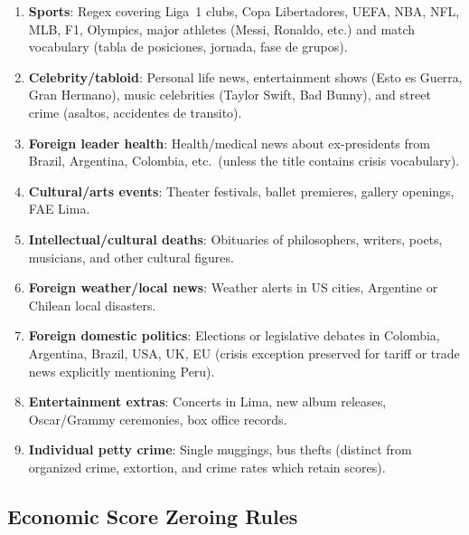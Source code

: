 \documentclass[12pt,a4paper]{article}
\begin{document}
\begin{enumerate}
  \item \textbf{Sports}: Regex covering Liga~1 clubs,
    Copa Libertadores, UEFA, NBA, NFL, MLB, F1, Olympics, major athletes
    (Messi, Ronaldo, etc.) and match vocabulary (tabla de posiciones,
    jornada, fase de grupos).

  \item \textbf{Celebrity/tabloid}: Personal life news, entertainment
    shows (Esto es Guerra, Gran Hermano), music celebrities (Taylor Swift,
    Bad Bunny), and street crime (asaltos, accidentes de transito).

  \item \textbf{Foreign leader health}: Health/medical news about
    ex-presidents from Brazil, Argentina, Colombia, etc.\ (unless the
    title contains crisis vocabulary).

  \item \textbf{Cultural/arts events}: Theater festivals, ballet
    premieres, gallery openings, FAE Lima.

  \item \textbf{Intellectual/cultural deaths}: Obituaries of
    philosophers, writers, poets, musicians, and other cultural figures.

  \item \textbf{Foreign weather/local news}: Weather alerts in US
    cities, Argentine or Chilean local disasters.

  \item \textbf{Foreign domestic politics}: Elections or legislative
    debates in Colombia, Argentina, Brazil, USA, UK, EU (crisis exception
    preserved for tariff or trade news explicitly mentioning Peru).

  \item \textbf{Entertainment extras}: Concerts in Lima, new album
    releases, Oscar/Grammy ceremonies, box office records.

  \item \textbf{Individual petty crime}: Single muggings, bus thefts
    (distinct from organized crime, extortion, and crime rates which
    retain scores).
\end{enumerate}

\subsection*{Economic Score Zeroing Rules}
\end{document}
